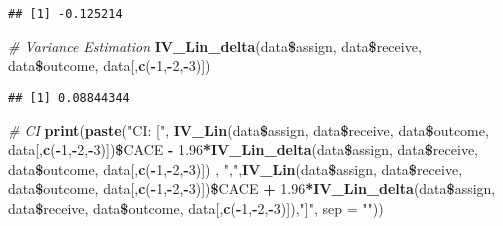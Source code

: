 \documentclass[]{article}
\newenvironment{Shaded}{\begin{snugshade}}{\end{snugshade}}
\newcommand{\KeywordTok}[1]{\textcolor[rgb]{0.13,0.29,0.53}{\textbf{#1}}}
\newcommand{\DataTypeTok}[1]{\textcolor[rgb]{0.13,0.29,0.53}{#1}}
\newcommand{\DecValTok}[1]{\textcolor[rgb]{0.00,0.00,0.81}{#1}}
\newcommand{\FloatTok}[1]{\textcolor[rgb]{0.00,0.00,0.81}{#1}}
\newcommand{\StringTok}[1]{\textcolor[rgb]{0.31,0.60,0.02}{#1}}
\newcommand{\CommentTok}[1]{\textcolor[rgb]{0.56,0.35,0.01}{\textit{#1}}}
\newcommand{\OperatorTok}[1]{\textcolor[rgb]{0.81,0.36,0.00}{\textbf{#1}}}
\newcommand{\NormalTok}[1]{#1}
\begin{document}
\begin{verbatim}
## [1] -0.125214
\end{verbatim}

\begin{Shaded}
\begin{Highlighting}[]
\CommentTok{# Variance Estimation}
\KeywordTok{IV_Lin_delta}\NormalTok{(data}\OperatorTok{\$}\NormalTok{assign, data}\OperatorTok{\$}\NormalTok{receive, data}\OperatorTok{\$}\NormalTok{outcome, data[,}\KeywordTok{c}\NormalTok{(}\OperatorTok{-}\DecValTok{1}\NormalTok{,}\OperatorTok{-}\DecValTok{2}\NormalTok{,}\OperatorTok{-}\DecValTok{3}\NormalTok{)])}
\end{Highlighting}
\end{Shaded}

\begin{verbatim}
## [1] 0.08844344
\end{verbatim}

\begin{Shaded}
\begin{Highlighting}[]
\CommentTok{# CI}
\KeywordTok{print}\NormalTok{(}\KeywordTok{paste}\NormalTok{(}\StringTok{"CI: ["}\NormalTok{, }\KeywordTok{IV_Lin}\NormalTok{(data}\OperatorTok{\$}\NormalTok{assign, data}\OperatorTok{\$}\NormalTok{receive, data}\OperatorTok{\$}\NormalTok{outcome, data[,}\KeywordTok{c}\NormalTok{(}\OperatorTok{-}\DecValTok{1}\NormalTok{,}\OperatorTok{-}\DecValTok{2}\NormalTok{,}\OperatorTok{-}\DecValTok{3}\NormalTok{)])}\OperatorTok{\$}\NormalTok{CACE }\OperatorTok{-}\StringTok{ }\FloatTok{1.96}\OperatorTok{*}\KeywordTok{IV_Lin_delta}\NormalTok{(data}\OperatorTok{\$}\NormalTok{assign, data}\OperatorTok{\$}\NormalTok{receive, data}\OperatorTok{\$}\NormalTok{outcome, data[,}\KeywordTok{c}\NormalTok{(}\OperatorTok{-}\DecValTok{1}\NormalTok{,}\OperatorTok{-}\DecValTok{2}\NormalTok{,}\OperatorTok{-}\DecValTok{3}\NormalTok{)]) , }\StringTok{","}\NormalTok{,}\KeywordTok{IV_Lin}\NormalTok{(data}\OperatorTok{\$}\NormalTok{assign, data}\OperatorTok{\$}\NormalTok{receive, data}\OperatorTok{\$}\NormalTok{outcome, data[,}\KeywordTok{c}\NormalTok{(}\OperatorTok{-}\DecValTok{1}\NormalTok{,}\OperatorTok{-}\DecValTok{2}\NormalTok{,}\OperatorTok{-}\DecValTok{3}\NormalTok{)])}\OperatorTok{\$}\NormalTok{CACE }\OperatorTok{+}\StringTok{ }\FloatTok{1.96}\OperatorTok{*}\KeywordTok{IV_Lin_delta}\NormalTok{(data}\OperatorTok{\$}\NormalTok{assign, data}\OperatorTok{\$}\NormalTok{receive, data}\OperatorTok{\$}\NormalTok{outcome, data[,}\KeywordTok{c}\NormalTok{(}\OperatorTok{-}\DecValTok{1}\NormalTok{,}\OperatorTok{-}\DecValTok{2}\NormalTok{,}\OperatorTok{-}\DecValTok{3}\NormalTok{)]),}\StringTok{"]"}\NormalTok{, }\DataTypeTok{sep =} \StringTok{""}\NormalTok{))}
\end{Highlighting}
\end{Shaded}
\end{document}
